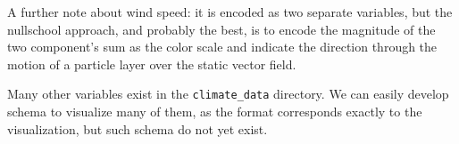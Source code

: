 \documentclass{article}
\begin{document}
A further note about wind speed: it is encoded as two separate variables, but the nullschool approach, and
probably the best, is to encode the magnitude of the two component’s sum as the color scale and indicate
the direction through the motion of a particle layer over the static vector field.

Many other variables exist in the \texttt{climate\_data} directory. We can easily develop schema to visualize many of them, as the format corresponds exactly to the visualization, but such schema do not yet exist.
\end{document}
